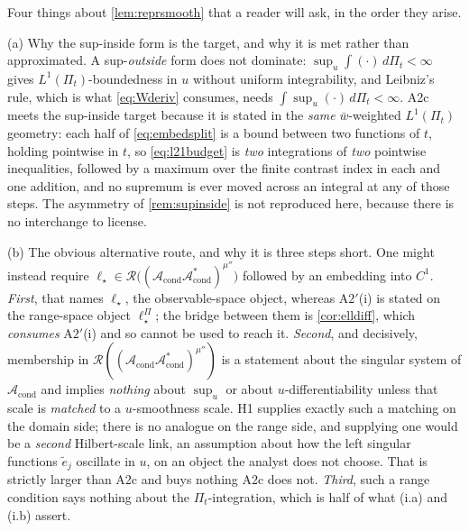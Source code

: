 \begin{remark}\label{rem:l21route}
Four things about \cref{lem:reprsmooth} that a reader will ask, in the order they arise.

\textup{(a)} Why the sup-inside form is the target, and why it is met rather than approximated.
A sup-\emph{outside} form does
not dominate: $\sup_u\int(\cdot)\,d\Pi_t<\infty$ gives $L^{1}(\Pi_t)$-boundedness in $u$ without uniform
integrability, and Leibniz's rule, which is what \eqref{eq:Wderiv} consumes, needs
$\int\sup_u(\cdot)\,d\Pi_t<\infty$. A2c meets the sup-inside target because it is stated in the
\emph{same} $\bar w$-weighted $L^{1}(\Pi_t)$ geometry: each half of \eqref{eq:embedsplit} is a bound
between two functions
of $t$, holding pointwise in $t$, so \eqref{eq:l21budget} is \emph{two} integrations of \emph{two}
pointwise inequalities, followed by a maximum over the finite contrast index in each and one addition,
and no supremum is ever moved across an integral at any of those steps. The asymmetry of
\cref{rem:supinside} is not reproduced here, because there is no interchange to license.

\textup{(b)} The obvious alternative route, and why it is three steps short. One might instead
require
$\ell_\star\in\mathcal R\big((\mathcal A_{\mathrm{cond}}\mathcal A^\ast_{\mathrm{cond}})^{\mu''}\big)$
followed by an embedding into $C^{1}$. \emph{First}, that names $\ell_\star$, the
observable-space object, whereas A$2'$(i) is stated on the range-space object
$\ell^\Pi_\star$; the bridge between them is \cref{cor:elldiff}, which \emph{consumes} A$2'$(i) and so
cannot be used to reach it. \emph{Second}, and decisively, membership in
$\mathcal R((\mathcal A_{\mathrm{cond}}\mathcal A^\ast_{\mathrm{cond}})^{\mu''})$ is a statement about the
singular system of $\mathcal A_{\mathrm{cond}}$ and implies \emph{nothing} about $\sup_u$ or about
$u$-differentiability unless that scale is \emph{matched} to a $u$-smoothness scale. H1 supplies exactly
such a matching on the domain side; there is no analogue on the range side, and supplying one would be a
\emph{second} Hilbert-scale link, an assumption about how the left singular functions $\tilde e_j$
oscillate in $u$, on an object the analyst does not choose. That is strictly larger than A2c and buys
nothing A2c does not. \emph{Third}, such a range condition says nothing about the $\Pi_t$-integration,
which is half of what (i.a) and (i.b) assert.


\end{remark}
